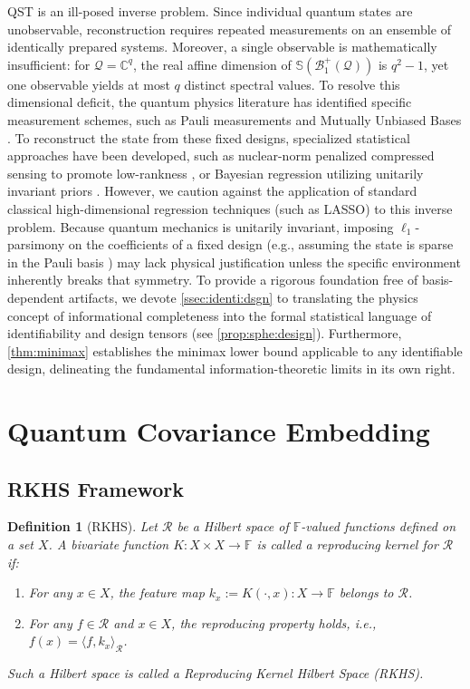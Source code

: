 \documentclass[noinfoline]{imsart}\setcounter{tocdepth}{2}
\renewcommand{\b}[1]{\mathbb{#1}} %
\renewcommand{\c}[1]{\mathcal{#1}} %
\theoremstyle{plain}
\newtheorem{definition}[theorem]{Definition}
\begin{document}
QST is an ill-posed inverse problem. Since individual quantum states are unobservable, reconstruction requires repeated measurements on an ensemble of identically prepared systems. Moreover, a single observable is mathematically insufficient: for $\c{Q} = \b{C}^{q}$, the real affine dimension of $\b{S}(\c{B}_{1}^{+}(\c{Q}))$ is $q^{2}-1$, yet one observable yields at most $q$ distinct spectral values. 
To resolve this dimensional deficit, the quantum physics literature has identified specific measurement schemes, such as Pauli measurements \cite{nielsen2010quantum,cai2016optimal} and Mutually Unbiased Bases \cite{klappenecker2005mutually}. To reconstruct the state from these fixed designs, specialized statistical approaches have been developed, such as nuclear-norm penalized compressed sensing to promote low-rankness \cite{gross2010quantum}, or Bayesian regression utilizing unitarily invariant priors \cite{blume2010optimal, lukens2020practical}. 
However, we caution against the application of standard classical high-dimensional regression techniques (such as LASSO) to this inverse problem. Because quantum mechanics is unitarily invariant, imposing $\ell_1$-parsimony on the coefficients of a fixed design (e.g., assuming the state is sparse in the Pauli basis \cite{cai2016optimal}) may lack physical justification unless the specific environment inherently breaks that symmetry. 
To provide a rigorous foundation free of basis-dependent artifacts, we devote \cref{ssec:identi:dsgn} to translating the physics concept of informational completeness into the formal statistical language of identifiability and design tensors (see \cref{prop:sphe:design}). Furthermore, \cref{thm:minimax} establishes the minimax lower bound applicable to any identifiable design, delineating the fundamental information-theoretic limits in its own right.

\section{Quantum Covariance Embedding}\label{sec:RKHS}

\subsection{RKHS Framework}
\begin{definition}[RKHS]
Let $\c{R}$ be a Hilbert space of $\b{F}$-valued functions defined on a set $X$. A bivariate function $K:X \times X \to \b{F}$ is called a reproducing kernel for $\c{R}$ if:
\begin{enumerate}
    \item For any $x \in X$, the feature map $k_{x}:= K(\cdot, x) : X \to \b{F}$ belongs to $\c{R}$.
    \item For any $f \in \c{R}$ and $x \in X$, the reproducing property holds, i.e., $f(x)=\langle f, k_{x} \rangle_{\c{R}}$.
\end{enumerate}
Such a Hilbert space is called a Reproducing Kernel Hilbert Space (RKHS). 
\end{definition}
\end{document}
